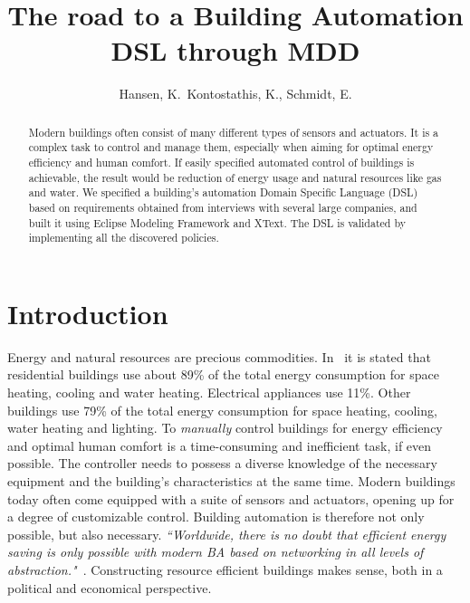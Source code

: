 \documentclass{llncs}
\begin{document}
\frontmatter
\pagestyle{headings}
\title{The road to a Building Automation DSL through MDD}
\author{Hansen, K.\, Kontostathis, K., Schmidt, E.}
\maketitle

\vspace{-0.3cm}

\begin{abstract}
Modern buildings often consist of many different types of sensors and actuators. It is a complex task to control and manage them, especially when aiming for optimal energy efficiency and human comfort. If easily specified automated control of buildings is achievable, the result would be reduction of energy usage and natural resources like gas and water. We specified a building's automation Domain Specific Language (DSL) based on requirements obtained from interviews with several large companies, and built it using Eclipse Modeling Framework and XText. The DSL is validated by implementing all the discovered policies.
\end{abstract}

\vspace{-0.5cm}

\section{Introduction}
Energy and natural resources are precious commodities. In~\cite{janssen2004towards} it is stated that residential buildings use about 89\% of the total energy consumption for space heating, cooling and water heating. Electrical appliances use 11\%. Other buildings use 79\% of the total energy consumption for space heating, cooling, water heating and lighting. To \textit{manually} control buildings for energy efficiency and optimal human comfort is a time-consuming and inefficient task, if even possible. The controller needs to possess a diverse knowledge of the necessary equipment and the building's characteristics at the same time. Modern buildings today often come equipped with a suite of sensors and actuators, opening up for a degree of customizable control. Building automation is therefore not only possible, but also necessary. \textit{``Worldwide, there is no doubt that efficient energy saving is only possible with modern BA based on networking in all levels of abstraction."}~\cite{dietrich2010communication}. Constructing resource efficient buildings makes sense, both in a political and economical perspective. 
\end{document}
